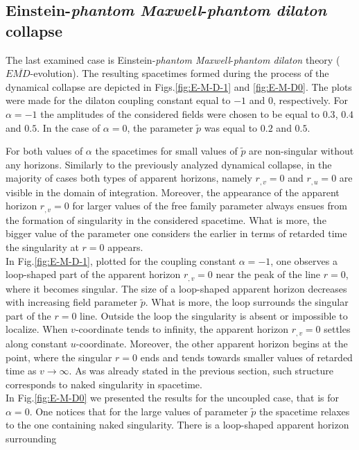 \documentclass[aps,showpacs,nofootinbib,floatfix]{revtex4}
\newcommand{\tpe}{{\tilde p}}
\begin{document}
\subsection{Einstein-{\it phantom Maxwell}-{\it phantom dilaton} collapse}
The last examined case is Einstein-{\it phantom Maxwell}-{\it phantom dilaton} 
theory ($E\overline{MD}$-evolution).
The resulting spacetimes formed during the process of the dynamical collapse are depicted in 
Figs.\ref{fig:E-M-D-1} and \ref{fig:E-M-D0}. The plots were made for the dilaton coupling 
constant equal to $-1$ and $0$, respectively. 
For $\alpha=-1$ the amplitudes of the considered fields were chosen to be equal to $0.3$, $0.4$ and $0.5$. 
In the case of $\alpha=0$, the parameter $\tpe$ was equal to $0.2$ and $0.5$.
\par
For both values of $\alpha$ the spacetimes for small values of $\tpe$ are non-singular without any horizons.
Similarly to the previously analyzed dynamical collapse, in the majority of cases both types of 
apparent horizons, namely $r_{,v}=0$ and  $r_{,u}=0$
are visible in the domain of integration. Moreover, the appearance of the apparent horizon $r_{,v}=0$ 
for larger values of the free family parameter always ensues from the formation of singularity in the considered spacetime. What is more, the bigger value
of the parameter one considers the earlier in terms of retarded time the singularity at $r=0$ appears.\\
In Fig.\ref{fig:E-M-D-1}, plotted for the coupling constant $\alpha=-1$, 
one observes a loop-shaped part of the apparent horizon $r_{,v}=0$ near the peak of the line $r=0$, where it 
becomes singular.
The size of a loop-shaped apparent horizon decreases with increasing field parameter $\tpe$.
What is more, the loop surrounds the singular part of the $r=0$ line. 
Outside the loop the singularity is absent or impossible to localize.
When $v$-coordinate tends to infinity, the apparent horizon $r_{,v}=0$ settles 
along constant $u$-coordinate.
Moreover, the other apparent horizon begins at the point, where the singular $r=0$ 
ends and tends towards smaller values of retarded time as $v\to\infty$. As was already 
stated in the previous section, such structure corresponds to naked singularity in spacetime.\\
In Fig.\ref{fig:E-M-D0} we presented the results for the uncoupled case, that is for $\alpha = 0$.
One notices that for the large values of parameter $\tpe$ the spacetime 
relaxes to the one containing naked singularity. There is a loop-shaped 
apparent horizon surrounding 
\end{document}
